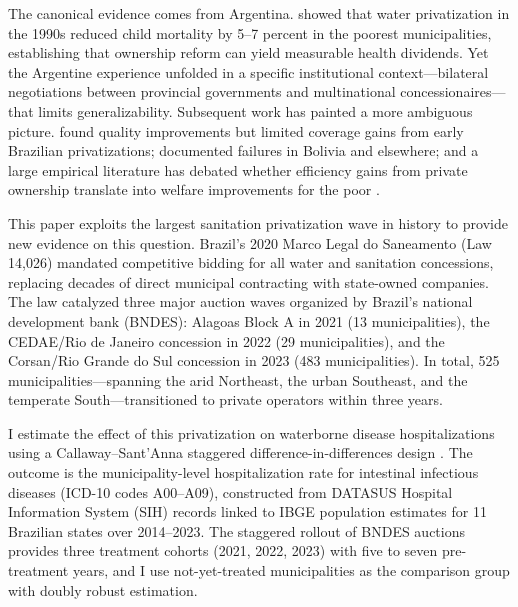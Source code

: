 \documentclass[12pt]{article}
\begin{document}
The canonical evidence comes from Argentina. \citet{galiani2005water} showed that water privatization in the 1990s reduced child mortality by 5--7 percent in the poorest municipalities, establishing that ownership reform can yield measurable health dividends. Yet the Argentine experience unfolded in a specific institutional context---bilateral negotiations between provincial governments and multinational concessionaires---that limits generalizability. Subsequent work has painted a more ambiguous picture. \citet{motta2006brazil} found quality improvements but limited coverage gains from early Brazilian privatizations; \citet{davis2008privatization} documented failures in Bolivia and elsewhere; and a large empirical literature has debated whether efficiency gains from private ownership translate into welfare improvements for the poor \citep{laporta1999benefits, megginson2005privatization, estache2005infrastructure}.

This paper exploits the largest sanitation privatization wave in history to provide new evidence on this question. Brazil's 2020 Marco Legal do Saneamento (Law 14,026) mandated competitive bidding for all water and sanitation concessions, replacing decades of direct municipal contracting with state-owned companies. The law catalyzed three major auction waves organized by Brazil's national development bank (BNDES): Alagoas Block A in 2021 (13 municipalities), the CEDAE/Rio de Janeiro concession in 2022 (29 municipalities), and the Corsan/Rio Grande do Sul concession in 2023 (483 municipalities). In total, 525 municipalities---spanning the arid Northeast, the urban Southeast, and the temperate South---transitioned to private operators within three years.

I estimate the effect of this privatization on waterborne disease hospitalizations using a Callaway--Sant'Anna staggered difference-in-differences design \citep{callaway2021did}. The outcome is the municipality-level hospitalization rate for intestinal infectious diseases (ICD-10 codes A00--A09), constructed from DATASUS Hospital Information System (SIH) records linked to IBGE population estimates for 11 Brazilian states over 2014--2023. The staggered rollout of BNDES auctions provides three treatment cohorts (2021, 2022, 2023) with five to seven pre-treatment years, and I use not-yet-treated municipalities as the comparison group with doubly robust estimation.
\end{document}
